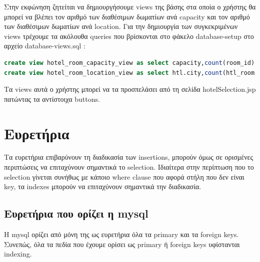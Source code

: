 \documentclass[a4paper,oneside, 11pt]{article}
\begin{document}
Στην εκφώνηση ζητείται να δημιουργήσουμε views της βάσης στα οποία ο χρήστης θα μπορεί να βλέπει τον αριθμό των διαθέσιμων δωματίων ανά capacity και τον αριθμό των διαθέσιμων δωματίων ανά location. 
Για την δημιουργία των συγκεκριμένων views τρέχουμε τα ακόλουθα queries που βρίσκονται στο φάκελο database-setup στο αρχείο database-views.sql :
\begin{lstlisting}[language=SQL]
create view hotel_room_capacity_view as select capacity,count(room_id) as rooms_per_capacity from hotel_room where room_id not in (select room_id from reserves where curdate() between start_date and finish_date) group by capacity; 
create view hotel_room_location_view as select htl.city,count(htl_room.room_id) as rooms_per_city from hotel as htl inner join hotel_room as htl_room on htl.hotel_id=htl_room.hotel_id where htl_room.room_id not in (select room_id from reserves where curdate() between start_date and finish_date) group by city; 
\end{lstlisting}
Τα views αυτά ο χρήστης μπορεί να τα προσπελάσει από τη σελίδα hotelSelection.jsp πατώντας τα αντίστοιχα buttons.
\section{Ευρετήρια}
Τα ευρετήρια επιβαρύνουν τη διαδικασία των insertions, μπορούν όμως σε ορισμένες περιπτώσεις να επιταχύνουν σημαντικά το selection. Ιδιαίτερα στην περίπτωση που το selection γίνεται συνήθως με κάποιο where clause που αφορά στήλη που δεν είναι key, τα indexes μπορούν να επιταχύνουν σημαντικά την διαδικασία.
\subsection{Ευρετήρια που ορίζει η mysql}
Η mysql ορίζει από μόνη της ως ευρετήρια όλα τα primary και τα foreign keys. Συνεπώς, όλα τα πεδία που έχουμε ορίσει ως primary ή foreign keys υφίστανται indexing. 
\end{document}
